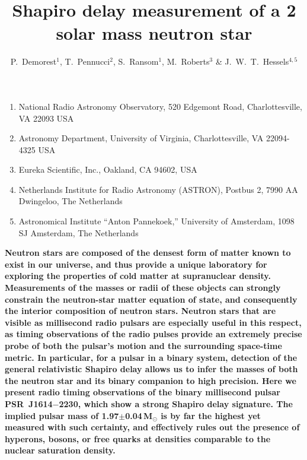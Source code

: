 \documentclass[12pt]{article}
\title{Shapiro delay measurement of a 2 solar mass neutron star}
\author{P.~Demorest$^{1}$, T.~Pennucci$^{2}$, S.~Ransom$^{1}$,
M.~Roberts$^{3}$ \& J.~W.~T.~Hessels$^{4,5}$}
\begin{document}
\maketitle

\begin{enumerate}
 \item National Radio Astronomy Observatory, 520 Edgemont Road, Charlottesville, VA 22093 USA
 \item Astronomy Department, University of Virginia,
 Charlottesville, VA 22094-4325 USA
 \item Eureka Scientific, Inc., Oakland, CA 94602, USA
 \item Netherlands Institute for Radio Astronomy (ASTRON), 
   Postbus 2, 7990 AA Dwingeloo, The Netherlands
 \item Astronomical Institute ``Anton Pannekoek,'' University 
   of Amsterdam, 1098 SJ Amsterdam, The Netherlands
\end{enumerate}

{\bf
  Neutron stars are composed of the densest form of matter known to
  exist in our universe, and thus provide a unique laboratory for
  exploring the properties of cold matter at supranuclear density.
  Measurements of the masses or radii of these objects can strongly
  constrain the neutron-star matter equation of state, and consequently
  the interior composition of neutron stars\cite{lp04,lp07}.  Neutron
  stars that are visible as millisecond radio pulsars are especially
  useful in this respect, as timing observations of the radio pulses
  provide an extremely precise probe of both the pulsar's motion and the
  surrounding space-time metric.  In particular, for a pulsar in a
  binary system, detection of the general relativistic Shapiro delay
  allows us to infer the masses of both the neutron star and its binary
  companion to high precision\cite{jhb+05,vbs+08}.  Here we present
  radio timing observations of the binary millisecond pulsar
  PSR~J1614$-$2230, which show a strong Shapiro delay signature.  The
  implied pulsar mass of 1.97$\pm$0.04\,M$_\odot$ is by far the highest
  yet measured with such certainty, and effectively rules out the
  presence of hyperons, bosons, or free quarks at densities comparable
  to the nuclear saturation density.  
}
\end{document}
